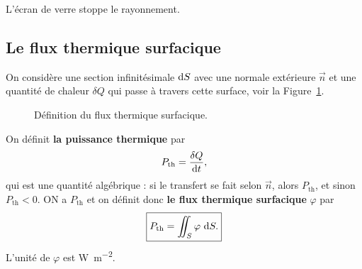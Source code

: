         \begin{example}
            L'écran de verre stoppe le rayonnement.
        \end{example}
    
    \subsection{Le flux thermique surfacique}

        On considère une section infinitésimale $\mathrm{d} S$ avec une normale extérieure $\vec{n}$ et une quantité de chaleur $\delta Q$ qui passe à travers cette surface, voir la Figure~\ref{fig:flux_thermique_surfacique_section}.

        \begin{figure}
            \centering
            \caption{Définition du flux thermique surfacique.}    
            \label{fig:flux_thermique_surfacique_section}
        \end{figure}

        \begin{definition}
            On définit \textbf{la puissance thermique} par 
            \begin{equation}
                P_{\text{th}}=\frac{\delta Q}{\mathrm{d} t},    
            \end{equation}
            qui est une quantité algébrique : si le transfert se fait selon $\vec{n}$, alors $P_{\text{th}}$, et sinon $P_{\text{th}}<0$. ON a $P_{\text{th}}$ et on définit donc \textbf{le flux thermique surfacique} $\varphi$ par
            \begin{equation}
                \boxed{
                    P_{\text{th}}=\iint_{S}\varphi~\mathrm{d} S.
                }
            \end{equation} 
            L'unité de $\varphi$ est \si{\watt\per\metre\squared}.
        \end{definition}


